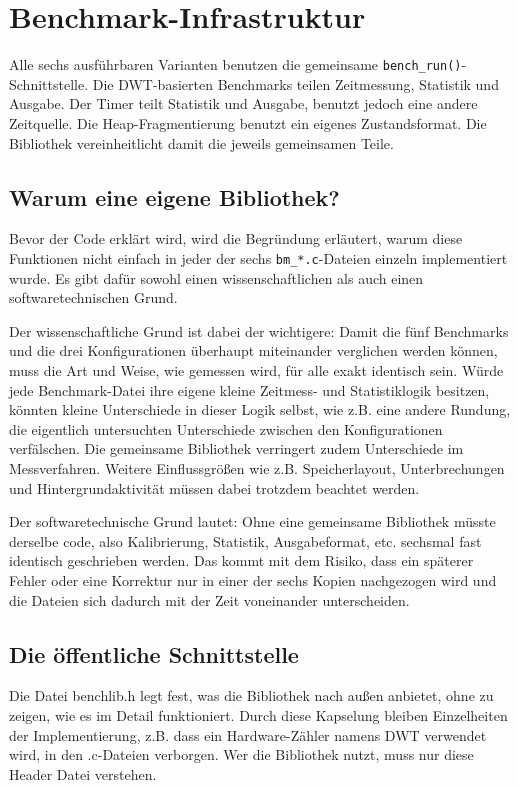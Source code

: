 \section{Benchmark-Infrastruktur}
Alle sechs ausführbaren Varianten benutzen die gemeinsame \lstinline[style=fileinline]|bench_run()|-Schnittstelle. Die DWT-basierten Benchmarks teilen Zeitmessung, Statistik und Ausgabe. Der Timer teilt Statistik und Ausgabe, benutzt jedoch eine andere Zeitquelle. Die Heap-Fragmentierung benutzt ein eigenes Zustandsformat. Die Bibliothek vereinheitlicht damit die jeweils gemeinsamen Teile.

\subsection{Warum eine eigene Bibliothek?}
Bevor der Code erklärt wird, wird die Begründung erläutert, warum diese Funktionen nicht einfach in jeder der sechs \lstinline[style=fileinline]|bm_*.c|-Dateien einzeln implementiert wurde. Es gibt dafür sowohl einen wissenschaftlichen als auch einen softwaretechnischen Grund.

Der wissenschaftliche Grund ist dabei der wichtigere: Damit die fünf Benchmarks und die drei Konfigurationen überhaupt miteinander verglichen werden können, muss die Art und Weise, wie gemessen wird, für alle exakt identisch sein. Würde jede Benchmark-Datei ihre eigene kleine Zeitmess- und Statistiklogik besitzen, könnten kleine Unterschiede in dieser Logik selbst, wie z.B. eine andere Rundung, die eigentlich untersuchten Unterschiede zwischen den Konfigurationen verfälschen. Die gemeinsame Bibliothek verringert zudem Unterschiede im Messverfahren. Weitere Einflussgrößen wie z.B. Speicherlayout, Unterbrechungen und Hintergrundaktivität müssen dabei trotzdem beachtet werden.

Der softwaretechnische Grund lautet: Ohne eine gemeinsame Bibliothek müsste derselbe code, also Kalibrierung, Statistik, Ausgabeformat, etc. sechsmal fast identisch geschrieben werden. Das kommt mit dem Risiko, dass ein späterer Fehler oder eine Korrektur nur in einer der sechs Kopien nachgezogen wird und die Dateien sich dadurch mit der Zeit voneinander unterscheiden.

\subsection{Die öffentliche Schnittstelle}
Die Datei benchlib.h legt fest, was die Bibliothek nach außen anbietet, ohne zu zeigen, wie es im Detail funktioniert. Durch diese Kapselung bleiben Einzelheiten der Implementierung, z.B. dass ein Hardware-Zähler namens DWT verwendet wird, in den .c-Dateien verborgen. Wer die Bibliothek nutzt, muss nur diese Header Datei verstehen.


